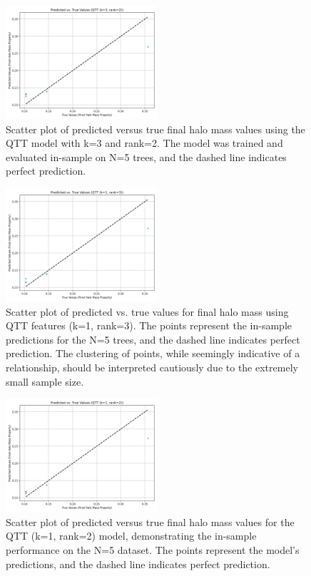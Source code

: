 \documentclass[twocolumn]{aastex631}
\begin{document}
\begin{figure}[h!]
    \centering
    \includegraphics[width=0.5\textwidth]{../input_files/plots/pred_vs_true_qtt_k3_r2_16_20250524-175150.png}
    \caption{Scatter plot of predicted versus true final halo mass values using the QTT model with k=3 and rank=2. The model was trained and evaluated in-sample on N=5 trees, and the dashed line indicates perfect prediction.
}
    \label{fig:pred_vs_true_qtt_k3_r2}
\end{figure}

\begin{figure}[h!]
    \centering
    \includegraphics[width=0.5\textwidth]{../input_files/plots/pred_vs_true_qtt_k1_r3_7_20250524-175150.png}
    \caption{Scatter plot of predicted vs. true values for final halo mass using QTT features (k=1, rank=3). The points represent the in-sample predictions for the N=5 trees, and the dashed line indicates perfect prediction. The clustering of points, while seemingly indicative of a relationship, should be interpreted cautiously due to the extremely small sample size.
}
    \label{fig:pred_vs_true_qtt_k1_r3}
\end{figure}

\begin{figure}[h!]
    \centering
    \includegraphics[width=0.5\textwidth]{../input_files/plots/pred_vs_true_qtt_k1_r2_4_20250524-175150.png}
    \caption{Scatter plot of predicted versus true final halo mass values for the QTT (k=1, rank=2) model, demonstrating the in-sample performance on the N=5 dataset. The points represent the model's predictions, and the dashed line indicates perfect prediction.
}
    \label{fig:pred_vs_true_qtt_k1_r2}
\end{figure}
\end{document}
